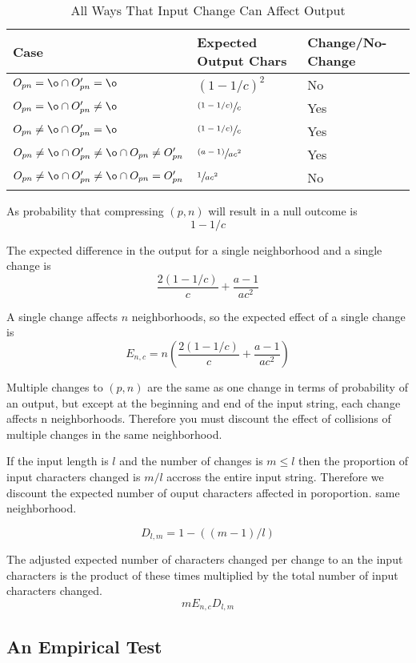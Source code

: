 \documentclass[html]{article}    %
\def\neigh {(p,n)}
\def\op {O_{pn}}
\def\opprm {O'_{pn}}
\begin{document}
\begin{table}[h!]
\begin{tabular}{|l|l|l|}
\hline
Case & Expected Output Chars & Change/No-Change\\ \hline
$\op=\o \cap \opprm=\o $ & $(1-1/c)^{2}$ & No \\ \hline 
$\op=\o \cap \opprm \neq \o $ & $\sfrac{(1-1/c)}{c}$ & Yes \\ \hline
$\op \neq \o \cap \opprm=\o $ & $\sfrac{(1-1/c)}{c}$ & Yes \\ \hline
$\op \neq \o \cap \opprm \neq \o \cap \op \neq \opprm $ & $\sfrac{(a-1)}{ac^{2}}$ & Yes \\ \hline
$\op \neq \o \cap \opprm \neq \o \cap \op = \opprm $ & $\sfrac{1}{ac^{2}}$ & No \\ \hline
\end{tabular}
\caption{All Ways That Input Change Can Affect Output}
\label{cases}
\end{table}

As probability that compressing $\neigh$ will result in a null outcome is 
\[
1-1/c
\]

The expected difference in the output for a single neighborhood and a single change is 
\[ \frac{2(1-1/c)}{c} + \frac{a-1}{ac^2} \]


A single change affects $n$ neighborhoods, so the expected effect of a single change is 
\[ E_{n,c} = n \left( \frac{2(1-1/c)}{c} + \frac{a-1}{ac^2} \right) \]


Multiple changes to $\neigh$ are the same as one change in terms of probability of an output, but 
except at the beginning and end of the input string, each change affects n neighborhoods.
Therefore you must discount the effect of collisions of multiple changes in the same neighborhood.

If the input length is $l$ and the number of changes is $m \leq l$ then the proportion of input characters changed is $m/l$
accross the entire input string.
Therefore we discount the expected number of ouput characters affected in poroportion. 
same neighborhood.

\[
	D_{l,m}=1-((m-1)/l)
\]


The adjusted expected number of characters changed per change to an the input characters is the product of these times
multiplied by the total number of input characters changed.
\[
	mE_{n,c}D_{l,m}
\]

\subsection{An Empirical Test}
\end{document}
